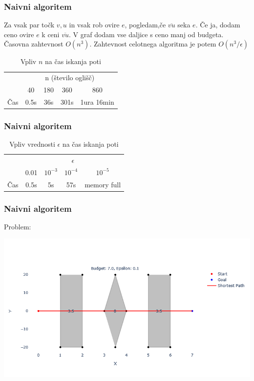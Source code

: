 \documentclass{beamer}
\begin{document}
\begin{frame}
    \frametitle{Naivni algoritem}
    Za vsak par točk $v,u$ in vsak rob ovire $e$, pogledam,če $\overline{vu}$ seka $e$. Če ja, dodam ceno ovire $e$ k ceni $\overline{vu}$. V graf dodam vse daljice s ceno manj od budgeta.
    \pause
    Časovna zahtevnost $O(n^3)$. Zahtevnost celotnega algoritma je potem  $O(n^3/\epsilon)$
    \pause
    \begin{table}[h]
        \centering
        \begin{tabular}{|c|c|c|c|c|}
            \hline
            & \multicolumn{4}{c|}{n (število oglišč)} \\
            \cline{2-5}
            & 40 & 180 & 360 & 860 \\
            \hline
            Čas & 0.5s & 36s &  301s &  1ura 16min\\
            \hline
        \end{tabular}
        \caption{Vpliv $n$ na čas iskanja poti}
        \label{tab:1}
    \end{table}

\end{frame}

\begin{frame}
    \frametitle{Naivni algoritem}
   
    \begin{table}[h]
        \centering
        \begin{tabular}{|c|c|c|c|c|}
            \hline
            & \multicolumn{4}{c|}{$\epsilon$} \\
            \cline{2-5}
            & 0.01 & $10^{-3}$ & $10^{-4}$ & $10^{-5}$ \\
            \hline
            Čas & 0.5s & 5s &  57s & memory full \\
            \hline
           
        \end{tabular}
        \caption{Vpliv vrednosti $\epsilon$ na čas iskanja poti}
        \label{tab:2}
    \end{table}


\end{frame}

\begin{frame}
    \frametitle{Naivni algoritem}
    Problem:

    \includegraphics[width=1\textwidth]{naiveErr.png}
\end{frame}
\end{document}
